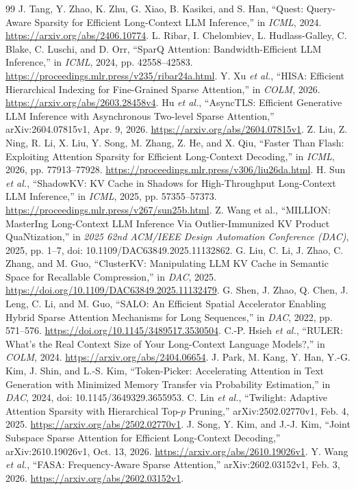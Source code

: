 \begin{thebibliography}{99}
 J. Tang, Y. Zhao, K. Zhu, G. Xiao, B. Kasikci, and S. Han, ``Quest: Query-Aware Sparsity for Efficient Long-Context LLM Inference,'' in \emph{ICML}, 2024. \url{https://arxiv.org/abs/2406.10774}.
 L. Ribar, I. Chelombiev, L. Hudlass-Galley, C. Blake, C. Luschi, and D. Orr, ``SparQ Attention: Bandwidth-Efficient LLM Inference,'' in \emph{ICML}, 2024, pp. 42558--42583. \url{https://proceedings.mlr.press/v235/ribar24a.html}.
 Y. Xu \emph{et al.}, ``HISA: Efficient Hierarchical Indexing for Fine-Grained Sparse Attention,'' in \emph{COLM}, 2026. \url{https://arxiv.org/abs/2603.28458v4}.
 Hu \emph{et al.}, ``AsyncTLS: Efficient Generative LLM Inference with Asynchronous Two-level Sparse Attention,'' arXiv:2604.07815v1, Apr. 9, 2026. \url{https://arxiv.org/abs/2604.07815v1}.
 Z. Liu, Z. Ning, R. Li, X. Liu, Y. Song, M. Zhang, Z. He, and X. Qiu, ``Faster Than Flash: Exploiting Attention Sparsity for Efficient Long-Context Decoding,'' in \emph{ICML}, 2026, pp. 77913--77928. \url{https://proceedings.mlr.press/v306/liu26da.html}.
 H. Sun \emph{et al.}, ``ShadowKV: KV Cache in Shadows for High-Throughput Long-Context LLM Inference,'' in \emph{ICML}, 2025, pp. 57355--57373. \url{https://proceedings.mlr.press/v267/sun25b.html}.
 Z. Wang et al., ``MILLION: MasterIng Long-Context LLM Inference Via Outlier-Immunized KV Product QuaNtization,'' in \emph{2025 62nd ACM/IEEE Design Automation Conference (DAC)}, 2025, pp. 1--7, doi: 10.1109/DAC63849.2025.11132862.
 G. Liu, C. Li, J. Zhao, C. Zhang, and M. Guo, ``ClusterKV: Manipulating LLM KV Cache in Semantic Space for Recallable Compression,'' in \emph{DAC}, 2025. \url{https://doi.org/10.1109/DAC63849.2025.11132479}.
 G. Shen, J. Zhao, Q. Chen, J. Leng, C. Li, and M. Guo, ``SALO: An Efficient Spatial Accelerator Enabling Hybrid Sparse Attention Mechanisms for Long Sequences,'' in \emph{DAC}, 2022, pp. 571--576. \url{https://doi.org/10.1145/3489517.3530504}.
 C.-P. Hsieh \emph{et al.}, ``RULER: What's the Real Context Size of Your Long-Context Language Models?,'' in \emph{COLM}, 2024. \url{https://arxiv.org/abs/2404.06654}.
 J. Park, M. Kang, Y. Han, Y.-G. Kim, J. Shin, and L.-S. Kim, ``Token-Picker: Accelerating Attention in Text Generation with Minimized Memory Transfer via Probability Estimation,'' in \emph{DAC}, 2024, doi: 10.1145/3649329.3655953.
 C. Lin \emph{et al.}, ``Twilight: Adaptive Attention Sparsity with Hierarchical Top-$p$ Pruning,'' arXiv:2502.02770v1, Feb. 4, 2025. \url{https://arxiv.org/abs/2502.02770v1}.
 J. Song, Y. Kim, and J.-J. Kim, ``Joint Subspace Sparse Attention for Efficient Long-Context Decoding,'' arXiv:2610.19026v1, Oct. 13, 2026. \url{https://arxiv.org/abs/2610.19026v1}.
 Y. Wang \emph{et al.}, ``FASA: Frequency-Aware Sparse Attention,'' arXiv:2602.03152v1, Feb. 3, 2026. \url{https://arxiv.org/abs/2602.03152v1}.
\end{thebibliography}
